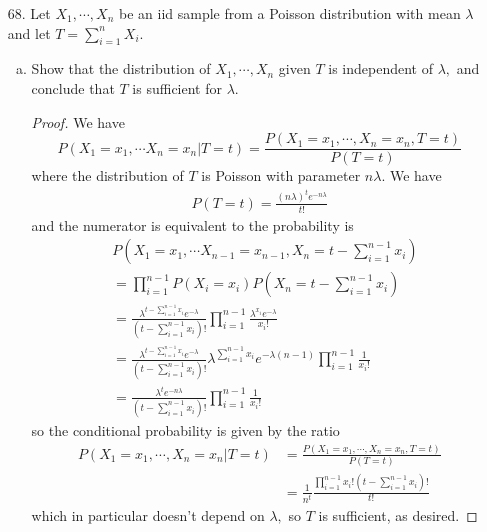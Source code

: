 \documentclass{article}
\begin{document}
\begin{itemize}
\begin{soln}
		\end{soln}
		
	\item[68.] Let $X_1, \cdots, X_n$ be an iid sample from a Poisson distribution with mean $\lambda$ and let $T=\displaystyle \sum_{i=1}^{n} X_i.$

		\begin{enumerate}[a.]
			\item Show that the distribution of $X_1, \cdots, X_n$ given $T$ is independent of $\lambda,$ and conclude that $T$ is sufficient for $\lambda.$
				\begin{proof}
					We have \[P(X_1=x_1,\cdots X_n=x_n|T=t)=\frac{P(X_1=x_1, \cdots, X_n=x_n, T=t)}{P(T=t)}\] where the distribution of $T$ is Poisson with parameter $n\lambda.$ We have
					\begin{align*}
						P(T=t) = \frac{(n\lambda)^t e^{-n\lambda}}{t!}
					\end{align*} and the numerator is equivalent to the probability is
					\begin{align*}
						& P\left(X_1=x_1, \cdots X_{n-1}=x_{n-1}, X_n=t-\sum_{i=1}^{n-1}x_i\right) \\
						&= \prod_{i=1}^{n-1}P(X_i=x_i)P\left( X_n=t-\sum_{i=1}^{n-1}x_i \right) \\ 
						&=\frac{\lambda^{t-\sum_{i=1}^{n-1}x_i} e^{-\lambda}}{\left( t-\sum_{i=1}^{n-1}x_i \right)!} \prod_{i=1}^{n-1} \frac{\lambda^{x_i} e^{-\lambda}}{x_i!} \\
						&= \frac{\lambda^{t-\sum_{i=1}^{n-1}x_i} e^{-\lambda}}{\left( t-\sum_{i=1}^{n-1}x_i \right)!} \lambda^{\sum_{i=1}^{n-1} x_i} e^{-\lambda(n-1)} \prod_{i=1}^{n-1}\frac{1}{x_i!} \\
						&= \frac{\lambda^t e^{-n\lambda}}{\left(t-\sum_{i=1}^{n-1}x_i\right)!}\prod_{i=1}^{n-1}\frac{1}{x_i!}
					\end{align*} so the conditional probability is given by the ratio
					\begin{align*}
						P(X_1=x_1, \cdots, X_n=x_n|T=t) &= \frac{P(X_1=x_1, \cdots, X_n=x_n, T=t)}{P(T=t)} \\
						&= \frac{1}{n^t}\frac{\prod_{i=1}^{n-1}x_i! \left( t-\sum_{i=1}^{n-1} x_i \right)!}{t!}
					\end{align*} which in particular doesn't depend on $\lambda,$ so $T$ is sufficient, as desired.
					
				\end{proof}


\end{enumerate}
\end{itemize}
\end{document}
